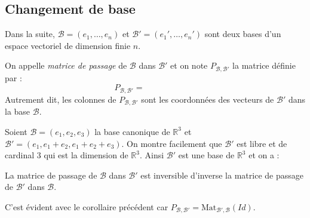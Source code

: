 \documentclass[a4paper,10pt]{report}
\begin{document}
\subsection{Changement de base}

Dans la suite, $\mathcal{B}=(e_1, \ldots, e_n)$ et $\mathcal{B}'= (e_1', \ldots,e_n')$ sont deux bases d'un espace vectoriel de dimension finie $n$.

\begin{Definition}{} On appelle \emph{matrice de passage} de $\mathcal{B}$ dans $\mathcal{B}'$ et on note $P_{\mathcal{B}, \mathcal{B}'}$ la matrice définie par :
$$ P_{\mathcal{B}, \mathcal{B}'} = \phantom{\textrm{Mat}_{\mathcal{B}', \mathcal{B}}(\textrm{Id})}$$
Autrement dit, les colonnes de $P_{\mathcal{B}, \mathcal{B}'}$ sont les coordonnées des vecteurs de $\mathcal{B}'$ dans la base $\mathcal{B}$.
\end{Definition}

\begin{Exemple} Soient $\mathcal{B}=(e_1,e_2,e_3)$ la base canonique de $\mathbb{R}^3$ et $\mathcal{B}'=(e_1,e_1+e_2, e_1+e_2+e_3)$. On montre facilement que $\mathcal{B}'$ est libre et de cardinal $3$ qui est la dimension de $\mathbb{R}^3$. Ainsi $\mathcal{B}'$ est une base de $\mathbb{R}^3$ et on a :

\vspace{2.7cm}
\end{Exemple}

\begin{Proposition}{} La matrice de passage de $\mathcal{B}$ dans $\mathcal{B}'$ est inversible d'inverse la matrice de passage de $\mathcal{B}'$ dans $\mathcal{B}$.
\end{Proposition}

\begin{Demonstration}{} C'est évident avec le corollaire précédent car $P_{\mathcal{B}, \mathcal{B}'} = \textrm{Mat}_{\mathcal{B}', \mathcal{B}}(Id)$.
\end{Demonstration}

\medskip
\end{document}

